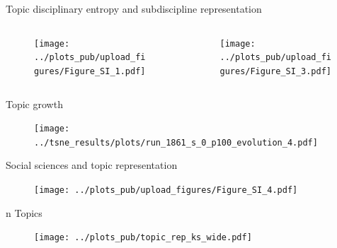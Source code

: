 \documentclass[9pt, aspectratio=169]{beamer}
\begin{document}
\appendix

\begin{frame}{Topic disciplinary entropy and subdiscipline representation}
\vspace{-0.4cm}
\begin{columns}
\begin{column}{0.5\linewidth}
\begin{figure}
	\texttt{[image: ../plots\_pub/upload\_figures/Figure\_SI\_1.pdf]}
\end{figure}
\end{column}
	
\begin{column}{0.5\linewidth}
	\begin{figure}
		\texttt{[image: ../plots\_pub/upload\_figures/Figure\_SI\_3.pdf]}
	\end{figure}
\end{column}

\end{columns}
\end{frame}

\begin{frame}{Topic growth}
\vspace{-0.4cm}
\begin{figure}
	\texttt{[image: ../tsne\_results/plots/run\_1861\_s\_0\_p100\_evolution\_4.pdf]}
\end{figure}

\end{frame}

\begin{frame}{Social sciences and topic representation}
\vspace{-0.4cm}
\begin{figure}
	\texttt{[image: ../plots\_pub/upload\_figures/Figure\_SI\_4.pdf]}
\end{figure}

\end{frame}

\begin{frame}{n Topics}
\vspace{-0.4cm}
\begin{figure}
	\texttt{[image: ../plots\_pub/topic\_rep\_ks\_wide.pdf]}
\end{figure}

\end{frame}

\end{document}
